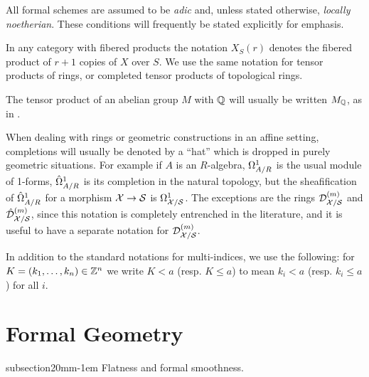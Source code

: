 \documentclass{article}
\makeatletter
\theoremstyle{change}
\renewcommand{\subsection}{\@startsection%
{subsection}{2}{0mm}{\baselineskip}{-1em}%
{\normalfont\normalsize\bfseries}}
\numberwithin{equation}{subsubsection}
\makeatother
\begin{document}
All formal schemes are assumed to be \textit{adic} and, unless stated
otherwise, \textit{locally noetherian}. These conditions will
frequently be stated explicitly for emphasis.

In any category with fibered products the notation $X_S(r)$ denotes
the fibered product of $r+1$ copies of $X$ over $S$. We use the same
notation for tensor products of rings, or completed tensor products of
topological rings. 

The tensor product of an abelian group $M$ with ${\mathbb Q}$ will usually be
written $M_{\mathbb Q}$, as in \cite{berthelot:1996}.

When dealing with rings or geometric constructions in an affine
setting, completions will usually be denoted by a ``hat'' which is
dropped in purely geometric situations. For example if $A$ is an
$R$-algebra, $\Omega^1_{A/R}$ is the usual module of 1-forms,
$\hat\Omega^1_{A/R}$ is its completion in the natural topology, but the
sheafification of $\hat\Omega^1_{A/R}$ for a morphism ${\cal X}\to{\cal S}$ is
$\Omega^1_{{\cal X}/{\cal S}}$. The exceptions are the rings
${{\cal D}}^{({m})}_{{\cal X}/{\cal S}}$ and ${\hat{\cal D}}^{({m})}_{{\cal X}/{\cal S}}$, since this
notation is completely entrenched in the literature, and it is useful
to have a separate notation for ${{\cal D}}^{({m})}_{{\cal X}/{\cal S}}$.

In addition to the standard notations for multi-indices, we use the
following: for $K=(k_1,\ldots,k_n)\in{\mathbb Z}^n$ we write $K<a$
(resp. $K\le a$) to mean $k_i<a$ (resp. $k_i\le a$) for all $i$.

\tableofcontents

\section{Formal Geometry}
\label{sec:formal-schemes}

\subsection{Flatness and formal smoothness.}
\label{sec:formal-flatness}
\end{document}
